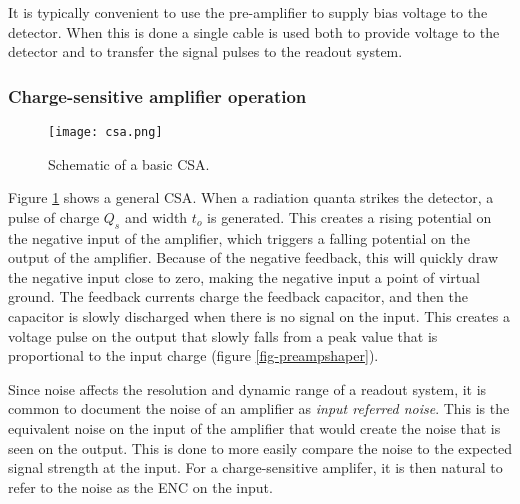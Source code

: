 \documentclass[../main/thesis.tex]{subfiles}
\begin{document}
It is typically convenient to use the pre-amplifier to supply bias voltage to the detector. When this is done a single cable is used both to provide voltage to the detector and to transfer the signal pulses to the readout system. \citep[chap. 16]{Knoll}


\subsubsection{Charge-sensitive amplifier operation}
\label{t-csa}
\begin{figure}%
	\centering
	\texttt{[image: csa.png]}
	\caption{Schematic of a basic \gls{CSA}. \citep{Hamamatsu}}
	\label{fig-csa}
\end{figure}

Figure \ref{fig-csa} shows a general \gls{CSA}. When a radiation quanta strikes the detector, a pulse of charge $Q_s$ and width $t_o$ is generated. This creates a rising potential on the negative input of the amplifier, which triggers a falling potential on the output of the amplifier. Because of the negative feedback, this will quickly draw the negative input close to zero, making the negative input a point of virtual ground. The feedback currents charge the feedback capacitor, and then the capacitor is slowly discharged when there is no signal on the input. This creates a voltage pulse on the output that slowly falls from a peak value that is proportional to the input charge (figure \ref{fig-preampshaper}). \citep{Hamamatsu}



Since noise affects the resolution and dynamic range of a readout system, it is common to document the noise of an amplifier as \textit{input referred noise}. This is the equivalent noise on the input of the amplifier that would create the noise that is seen on the output. This is done to more easily compare the noise to the expected signal strength at the input. For a charge-sensitive amplifer, it is then natural to refer to the noise as the \acrfull{ENC} on the input.  
\end{document}
